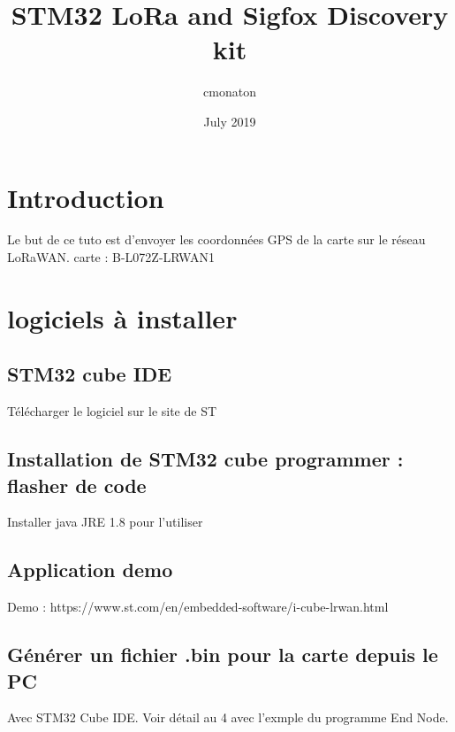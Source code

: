 \documentclass{article}
\title{STM32 LoRa and Sigfox Discovery kit}
\author{cmonaton }
\date{July 2019}
\begin{document}
\maketitle

\section{Introduction}
Le but de ce tuto est d'envoyer les coordonnées GPS de la carte sur le réseau LoRaWAN.
carte : B-L072Z-LRWAN1
\section{logiciels à installer}




\subsection{STM32 cube IDE }
Télécharger le logiciel sur le site de ST


\subsection{Installation de STM32 cube programmer : flasher de code}

Installer java JRE 1.8 pour l'utiliser

\subsection{Application demo}

Demo : https://www.st.com/en/embedded-software/i-cube-lrwan.html


\subsection{Générer un fichier .bin pour la carte depuis le PC}
Avec STM32 Cube IDE. Voir détail au 4 avec l'exmple du programme End Node.
\end{document}
